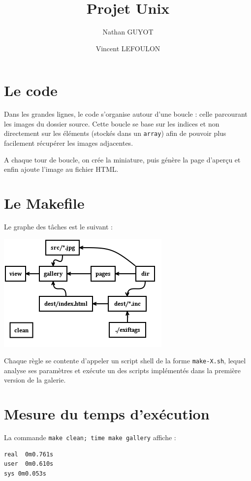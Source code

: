 \documentclass[a4paper,11pt]{article}
\title{Projet Unix}
\author{Nathan GUYOT \and Vincent LEFOULON}
\begin{document}
\maketitle

\section{Le code}

Dans les grandes lignes, le code s'organise autour d'une boucle : celle parcourant
les images du dossier source. Cette boucle se base sur les indices et non directement
sur les éléments (stockés dans un \verb+array+) afin de pouvoir plus facilement
récupérer les images adjacentes.

A chaque tour de boucle, on crée la miniature, puis génère la page d'aperçu et enfin ajoute l'image au fichier HTML.

\section{Le Makefile}

Le graphe des tâches est le suivant :

\includegraphics[width=320px]{MakefileGraph.png}

Chaque règle se contente d'appeler un script shell de la forme \verb+make-X.sh+, lequel analyse ses paramètres et exécute un des scripts implémentés dans la première version de la galerie.

\section{Mesure du temps d'exécution}

La commande \verb+make clean; time make gallery+ affiche :

\begin{verbatim}
real  0m0.761s
user  0m0.610s
sys 0m0.053s
\end{verbatim}
\end{document}
